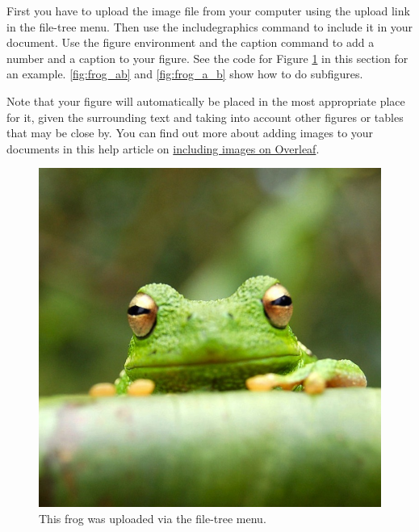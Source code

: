 \documentclass[twocolumn, 9pt]{extarticle}
\begin{document}
First you have to upload the image file from your computer using the upload link in the file-tree menu. Then use the includegraphics command to include it in your document. Use the figure environment and the caption command to add a number and a caption to your figure. See the code for Figure \ref{fig:frog} in this section for an example. \ref{fig:frog_ab} and \ref{fig:frog_a_b} show how to do subfigures.

Note that your figure will automatically be placed in the most appropriate place for it, given the surrounding text and taking into account other figures or tables that may be close by. You can find out more about adding images to your documents in this help article on \href{https://www.overleaf.com/learn/how-to/Including_images_on_Overleaf}{including images on Overleaf}.

\begin{figure}[ht]
\centering
\includegraphics[width=0.1\linewidth]{frog.jpg}
\caption{\label{fig:frog}This frog was uploaded via the file-tree menu.}
\end{figure}
\end{document}

